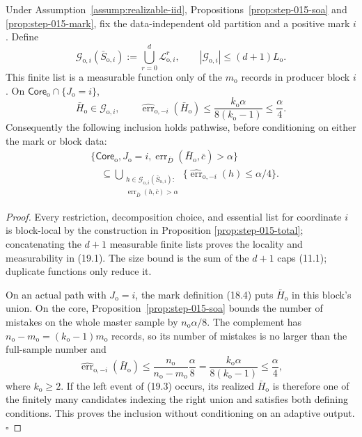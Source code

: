 \begin{lemma}\label{lem:step-015-reconstruct}
Under Assumption~\ref{assump:realizable-iid},
Propositions~\ref{prop:step-015-soa} and
\ref{prop:step-015-mark}, fix the data-independent old partition and a
positive mark \(i\). Define
\[
\mathcal G_{\mathrm o,i}(\bar S_{\mathrm o,i})
:=\bigcup_{r=0}^d\mathcal L_{\mathrm o,i}^r,\qquad
|\mathcal G_{\mathrm o,i}|\le(d+1)L_{\mathrm o}.
\tag{19.1}
\]
This finite list is a measurable function only of the \(m_{\mathrm o}\)
records in producer block \(i\). On
\(\mathsf{Core}_{\mathrm o}\cap\{J_{\mathrm o}=i\}\),
\[
\bar H_{\mathrm o}\in\mathcal G_{\mathrm o,i},
\qquad
\widehat{\operatorname{err}}_{\mathrm o,-i}(\bar H_{\mathrm o})
\le\frac{k_{\mathrm o}\alpha}{8(k_{\mathrm o}-1)}
\le\frac\alpha4.
\tag{19.2}
\]
Consequently the following inclusion holds pathwise, before conditioning
on either the mark or block data:
\[
\begin{aligned}
&\{\mathsf{Core}_{\mathrm o},J_{\mathrm o}=i,
\operatorname{err}_{\bar D}(\bar H_{\mathrm o},\bar c)>\alpha\}\\
&\quad\subseteq
\bigcup_{\substack{h\in\mathcal G_{\mathrm o,i}(\bar S_{\mathrm o,i}):\\
\operatorname{err}_{\bar D}(h,\bar c)>\alpha}}
\{\widehat{\operatorname{err}}_{\mathrm o,-i}(h)\le\alpha/4\}.
\end{aligned}
\tag{19.3}
\]


\end{lemma}

\begin{proof}
Every restriction, decomposition choice, and essential list for coordinate
\(i\) is block-local by the construction in Proposition
\ref{prop:step-015-total}; concatenating the \(d+1\) measurable finite
lists proves the locality and measurability in (19.1). The size bound is
the sum of the \(d+1\) caps (11.1); duplicate functions only reduce it.

On an actual path with \(J_{\mathrm o}=i\), the mark definition (18.4)
puts \(\bar H_{\mathrm o}\) in this block's union. On the core,
Proposition~\ref{prop:step-015-soa} bounds the number of mistakes on the
whole master sample by \(n_{\mathrm o}\alpha/8\). The complement has
\(n_{\mathrm o}-m_{\mathrm o}=(k_{\mathrm o}-1)m_{\mathrm o}\) records,
so its number of mistakes is no larger than the full-sample number and
\[
\widehat{\operatorname{err}}_{\mathrm o,-i}(\bar H_{\mathrm o})
\le\frac{n_{\mathrm o}}{n_{\mathrm o}-m_{\mathrm o}}\frac\alpha8
=\frac{k_{\mathrm o}\alpha}{8(k_{\mathrm o}-1)}
\le\frac\alpha4,
\]
where \(k_{\mathrm o}\ge2\). If the left event of (19.3) occurs, its
realized \(\bar H_{\mathrm o}\) is therefore one of the finitely many
candidates indexing the right union and satisfies both defining
conditions. This proves the inclusion without conditioning on an adaptive
output. \(\square\)


\end{proof}


